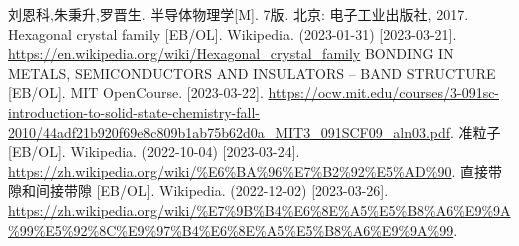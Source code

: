 \begin{thebibliography}{99}%
     刘恩科,朱秉升,罗晋生. 半导体物理学[M]. 7版. 北京: 电子工业出版社, 2017.
     Hexagonal crystal family [EB/OL]. Wikipedia. (2023-01-31) [2023-03-21].\\ \url{https://en.wikipedia.org/wiki/Hexagonal_crystal_family}
     BONDING IN METALS, SEMICONDUCTORS AND
    INSULATORS – BAND STRUCTURE [EB/OL]. MIT OpenCourse. [2023-03-22]. \url{https://ocw.mit.edu/courses/3-091sc-introduction-to-solid-state-chemistry-fall-2010/44adf21b920f69e8c809b1ab75b62d0a_MIT3_091SCF09_aln03.pdf}.
     准粒子 [EB/OL]. Wikipedia. (2022-10-04) [2023-03-24].\\ \url{https://zh.wikipedia.org/wiki/%E6%BA%96%E7%B2%92%E5%AD%90}.
     直接带隙和间接带隙 [EB/OL]. Wikipedia. (2022-12-02) [2023-03-26].\\ \url{https://zh.wikipedia.org/wiki/%E7%9B%B4%E6%8E%A5%E5%B8%A6%E9%9A%99%E5%92%8C%E9%97%B4%E6%8E%A5%E5%B8%A6%E9%9A%99}.
\end{thebibliography}
